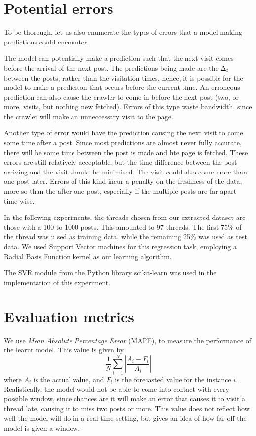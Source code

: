 
\section{Potential errors}
To be thorough, let us also enumerate the types of errors that a model making 
predictions could encounter.

The model can potentially make a prediction such that the next visit comes 
before the arrival of the next post. The predictions being made are the $\Delta_t$ 
between the posts, rather than the visitation times, hence, it is possible for 
the model to make a prediciton that occurs before the current time. An erroneous 
prediction can also cause the crawler to come in before the next post (two, or 
more, visits, but nothing new fetched). Errors of this type waste bandwidth, 
since the crawler will make an unneccessary visit to the page.

Another type of error would have the prediction causing the next visit to come 
some time after a post. Since most predictions are almost never fully accurate, 
there will be some time between the post is made and hte page is fetched. These 
errors are still relatively acceptable, but the time difference between the post 
arriving and the visit should be minimised. The visit could also come more than 
one post later. Errors of this kind incur a penalty on the freshness of the 
data, more so than the after one post, especially if the multiple posts are far 
apart time-wise.


In the following experiments, the threads chosen from our extracted dataset are 
those with a 100 to 1000 posts. This amounted to 97 threads. The first 75\% of 
the thread was u sed as training data, while the remaining 25\% was used as test 
data. We used Support Vector machines for this regression task, employing a 
Radial Basis Function kernel as our learning algorithm. 

The SVR module from the Python library scikit-learn was used in the implementation of this experiment.



\section{Evaluation metrics}
We use \emph{Mean Absolute Percentage Error} (MAPE), to measure the performance of the learnt model. This value is given by
\[
	\frac{1}{N}\sum^N_{i=1}\left|\frac{A_i-F_i}{A_i}\right|
\]
where $A_i$ is the actual value, and $F_i$ is the forecasted value for the 
instance $i$. Realistically, the model would not be able to come into contact 
with every possible window, since chances are it will make an error that causes 
it to visit a thread late, causing it to miss two posts or more. This value does 
not reflect how well the model will do in a real-time setting, but gives an idea 
of how far off the model is given a window. 

